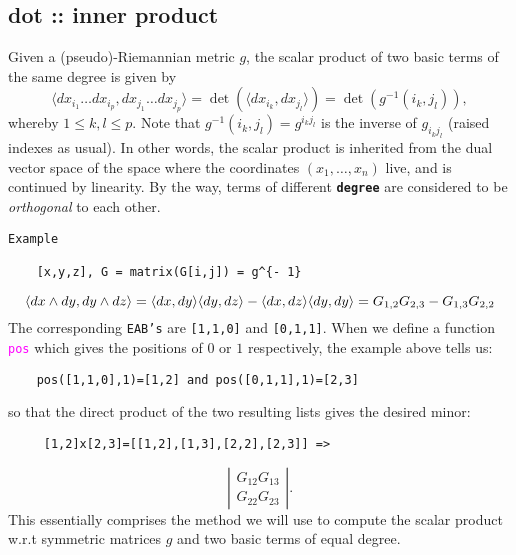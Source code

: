 \documentclass[12pt,a4paper]{article}
\newcommand{\spadfun}[1]{\textcolor{magenta}{\tt #1}}
\newcommand{\spadbold}[1]{{\tt\bf #1}}
\begin{document}
\subsection{dot :: inner product}
Given a (pseudo)-Riemannian metric $g$, the scalar product of two basic 
terms of the same degree is given by
\begin{displaymath}
 \langle d x_{i_1} \ldots d x_{i_p}, d x_{j_1} \ldots d x_{j_p} \rangle =
   \det (\langle d x_{i_k} , d x_{j_l} \rangle) = \det (g^{- 1} (i_k,
   j_l)),
\end{displaymath}
whereby $1 \leqslant k, l \leqslant p$. Note that 
$g^{- 1} (i_k, j_l) = g^{i_k j_l}$ is the inverse of 
$g_{i_k j_l}$ (raised indexes as usual). In other words, the scalar 
product is inherited from the dual vector space of the space where the 
coordinates $(x_1, \ldots, x_n)$ live, and is continued by linearity.
By the way, terms of different \spadbold{degree} are considered to be
{\it orthogonal} to each other.
\begin{lstlisting}
Example
  
    [x,y,z], G = matrix(G[i,j]) = g^{- 1}
\end{lstlisting}
\begin{displaymath}
\langle d x \wedge d y, d y \wedge d z \rangle = \langle d x, d y \rangle
     \langle d y, d z \rangle - \langle d x, d z \rangle \langle d y, d y
     \rangle = \\ {G_{1,2} G_{2, 3} - G_{1, 3} G_{2, 2}} 
\end{displaymath}
The corresponding {\tt EAB's} are {\tt [1,1,0]} and {\tt [0,1,1]}. 
When we define a function \spadfun{pos} which gives the positions of 
$0$ or $1$ respectively, the example above tells us:
\begin{lstlisting}
    pos([1,1,0],1)=[1,2] and pos([0,1,1],1)=[2,3]
\end{lstlisting}
so that the direct product of the two resulting lists gives the desired 
minor:
\begin{lstlisting}
     [1,2]x[2,3]=[[1,2],[1,3],[2,2],[2,3]] =>
\end{lstlisting}
\begin{displaymath}
  \left|\begin{array}{c}
     G_{12} G_{1 3}\\
     G_{2 2} G_{2 3}
   \end{array}\right| .
\end{displaymath}
This essentially comprises the method we will use to compute the scalar 
product w.r.t symmetric matrices $g$ and two basic terms of equal degree.
\end{document}
